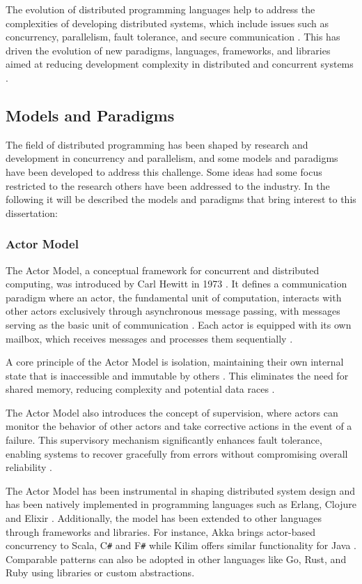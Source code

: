 The evolution of distributed programming languages help to address the complexities of developing distributed systems, which include issues such as concurrency, parallelism, fault tolerance, and secure communication \cite{Armstrong2013}. This has driven the evolution of new paradigms, languages, frameworks, and libraries aimed at reducing development complexity in distributed and concurrent systems \cite{Valkov2018}.

\subsection{Models and Paradigms}

The field of distributed programming has been shaped by research and development in concurrency and parallelism, and some models and paradigms have been developed to address this challenge. Some ideas had some focus restricted to the research others have been addressed to the industry. In the following it will be described the models and paradigms that bring interest to this dissertation:

\subsubsection{Actor Model}

The Actor Model, a conceptual framework for concurrent and distributed computing, was introduced by Carl Hewitt in 1973 \cite{Hewitt1973}. It defines a communication paradigm where an actor, the fundamental unit of computation, interacts with other actors exclusively through asynchronous message passing, with messages serving as the basic unit of communication \cite{Trinder2017}. Each actor is equipped with its own mailbox, which receives messages and processes them sequentially \cite{Koster2016}.

A core principle of the Actor Model is isolation, maintaining their own internal state that is inaccessible and immutable by others \cite{Koster2016}. This eliminates the need for shared memory, reducing complexity and potential data races \cite{Valkov2018}.

The Actor Model also introduces the concept of supervision, where actors can monitor the behavior of other actors and take corrective actions in the event of a failure. This supervisory mechanism significantly enhances fault tolerance, enabling systems to recover gracefully from errors without compromising overall reliability \cite{Trinder2017}.

The Actor Model has been instrumental in shaping distributed system design and has been natively implemented in programming languages such as Erlang, Clojure and Elixir \cite{Randtoul2022}. Additionally, the model has been extended to other languages through frameworks and libraries. For instance, Akka brings actor-based concurrency to Scala, C\texttt{\#} and F\texttt{\#} while Kilim offers similar functionality for Java \cite{Trinder2017}. Comparable patterns can also be adopted in other languages like Go, Rust, and Ruby using libraries or custom abstractions.

